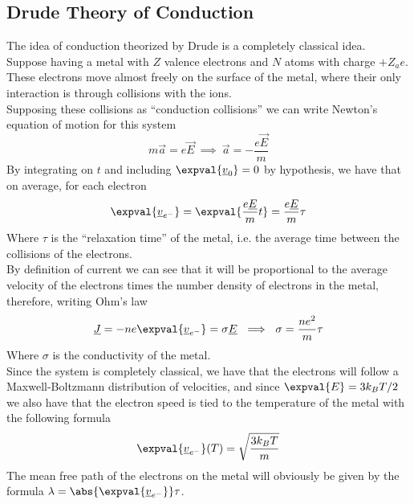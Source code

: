 \documentclass[../qm.tex]{subfiles}
\begin{document}
\subsection{Drude Theory of Conduction}
The idea of conduction theorized by Drude is a completely classical idea.\\
Suppose having a metal with $Z$ valence electrons and $N$ atoms with charge $+Z_ae$. These electrons move almost freely on the surface of the metal, where their only interaction is through collisions with the ions.\\
Supposing these collisions as ``conduction collisions'' we can write Newton's equation of motion for this system
\begin{equation}
	m\vec{a}=e\vec{E}\ \implies\ \vec{a} = -\frac{e\vec{E}}{m}
	\label{eq:drudecond}
\end{equation}
By integrating on $t$ and including $\expval{\vec{v}_0}=0$ by hypothesis, we have that on average, for each electron
\begin{equation}
	\expval{\vec{v}_{e^-}}=\expval{\frac{e\vec{E}}{m}t}=\frac{e\vec{E}}{m}\tau
	\label{eq:reltime}
\end{equation}
Where $\tau$ is the ``relaxation time'' of the metal, i.e. the average time between the collisions of the electrons.\\
By definition of current we can see that it will be proportional to the average velocity of the electrons times the number density of electrons in the metal, therefore, writing Ohm's law
\begin{equation}
	\vec{J}=-ne\expval{\vec{v}_{e^-}}=\sigma\vec{E}\ \implies\ \sigma=\frac{ne^2}{m}\tau
	\label{eq:conductivity}
\end{equation}
Where $\sigma$ is the conductivity of the metal.\\
Since the system is completely classical, we have that the electrons will follow a Maxwell-Boltzmann distribution of velocities, and since $\expval{E}=3k_BT/2$ we also have that the electron speed is tied to the temperature of the metal with the following formula
\begin{equation}
	\expval{\vec{v}_{e^-}}(T)=\sqrt{\frac{3k_BT}{m}}
	\label{eq:drudevel}
\end{equation}
The mean free path of the electrons on the metal will obviously be given by the formula $\lambda=\abs{\expval{\vec{v}_{e^-}}}\tau$.
\end{document}
